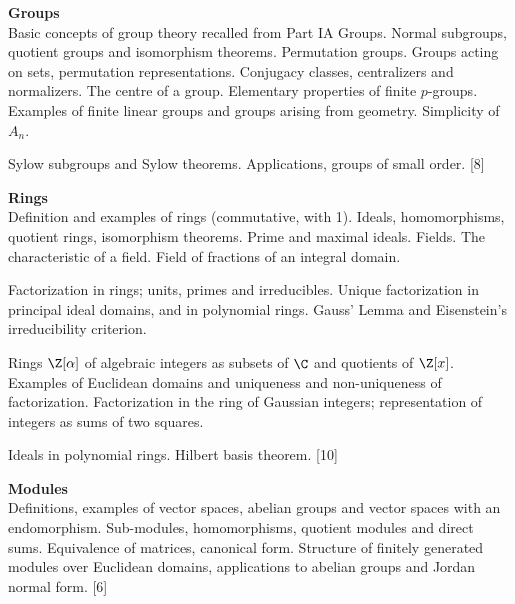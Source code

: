 \documentclass[a4paper]{article}
\begin{document}
\maketitle
{\small
\noindent\textbf{Groups}\\
Basic concepts of group theory recalled from Part IA Groups. Normal subgroups, quotient groups and isomorphism theorems. Permutation groups. Groups acting on sets, permutation representations. Conjugacy classes, centralizers and normalizers. The centre of a group. Elementary properties of finite $p$-groups. Examples of finite linear groups and groups arising from geometry. Simplicity of $A_n$.

\vspace{5pt}
\noindent Sylow subgroups and Sylow theorems. Applications, groups of small order.\hspace*{\fill} [8]

\vspace{10pt}
\noindent\textbf{Rings}\\
Definition and examples of rings (commutative, with 1). Ideals, homomorphisms, quotient rings, isomorphism theorems. Prime and maximal ideals. Fields. The characteristic of a field. Field of fractions of an integral domain.

\vspace{5pt}
\noindent Factorization in rings; units, primes and irreducibles. Unique factorization in principal ideal domains, and in polynomial rings. Gauss' Lemma and Eisenstein's irreducibility criterion.

\vspace{5pt}
\noindent Rings $\Z[\alpha]$ of algebraic integers as subsets of $\C$ and quotients of $\Z[x]$. Examples of Euclidean domains and uniqueness and non-uniqueness of factorization. Factorization in the ring of Gaussian integers; representation of integers as sums of two squares.

\vspace{5pt}
\noindent Ideals in polynomial rings. Hilbert basis theorem.\hspace*{\fill} [10]

\vspace{10pt}
\noindent\textbf{Modules}\\
Definitions, examples of vector spaces, abelian groups and vector spaces with an endomorphism. Sub-modules, homomorphisms, quotient modules and direct sums. Equivalence of matrices, canonical form. Structure of finitely generated modules over Euclidean domains, applications to abelian groups and Jordan normal form.\hspace*{\fill} [6]}
\end{document}
